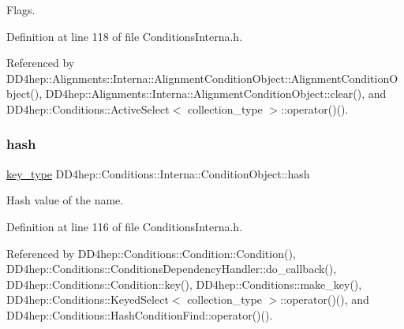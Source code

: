 Flags. 



Definition at line 118 of file Conditions\+Interna.\+h.



Referenced by D\+D4hep\+::\+Alignments\+::\+Interna\+::\+Alignment\+Condition\+Object\+::\+Alignment\+Condition\+Object(), D\+D4hep\+::\+Alignments\+::\+Interna\+::\+Alignment\+Condition\+Object\+::clear(), and D\+D4hep\+::\+Conditions\+::\+Active\+Select$<$ collection\+\_\+type $>$\+::operator()().

\hypertarget{class_d_d4hep_1_1_conditions_1_1_interna_1_1_condition_object_a6333e2a00c29743a1d64a26356714024}{}\label{class_d_d4hep_1_1_conditions_1_1_interna_1_1_condition_object_a6333e2a00c29743a1d64a26356714024} 
\subsubsection{\texorpdfstring{hash}{hash}}
{\footnotesize\ttfamily \hyperlink{class_d_d4hep_1_1_conditions_1_1_interna_1_1_condition_object_a61a3251d047bd75dcdebb0e1c1409101}{key\+\_\+type} D\+D4hep\+::\+Conditions\+::\+Interna\+::\+Condition\+Object\+::hash}



Hash value of the name. 



Definition at line 116 of file Conditions\+Interna.\+h.



Referenced by D\+D4hep\+::\+Conditions\+::\+Condition\+::\+Condition(), D\+D4hep\+::\+Conditions\+::\+Conditions\+Dependency\+Handler\+::do\+\_\+callback(), D\+D4hep\+::\+Conditions\+::\+Condition\+::key(), D\+D4hep\+::\+Conditions\+::make\+\_\+key(), D\+D4hep\+::\+Conditions\+::\+Keyed\+Select$<$ collection\+\_\+type $>$\+::operator()(), and D\+D4hep\+::\+Conditions\+::\+Hash\+Condition\+Find\+::operator()().

\hypertarget{class_d_d4hep_1_1_conditions_1_1_interna_1_1_condition_object_af04a3341b8791fbcf60fe5e5fff20166}{}\label{class_d_d4hep_1_1_conditions_1_1_interna_1_1_condition_object_af04a3341b8791fbcf60fe5e5fff20166} 
